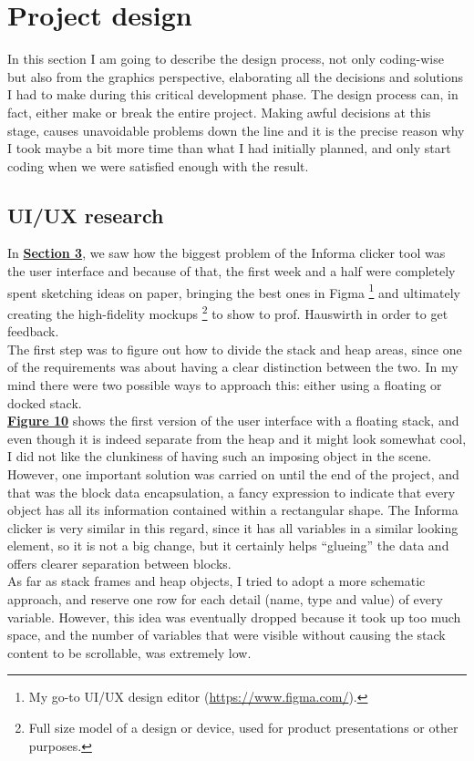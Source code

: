 \documentclass[]{usiinfbachelorproject}
\begin{document}
\vspace{\fill}
\pagebreak

\section{Project design} \label{design}

In this section I am going to describe the design process, not only coding-wise but also from the graphics perspective, elaborating all the decisions and solutions I had to make during this critical development phase. The design process can, in fact, either make or break the entire project. Making awful decisions at this stage, causes unavoidable problems down the line and it is the precise reason why I took maybe a bit more time than what I had initially planned, and only start coding when we were satisfied enough with the result.

\subsection{UI/UX research} \label{ui-ux research}

In \hyperref[requirements+analysis]{\textbf{Section 3}}, we saw how the biggest problem of the Informa clicker tool was the user interface and because of that, the first week and a half were completely spent sketching ideas on paper, bringing the best ones in Figma \footnote{My go-to UI/UX design editor (\url{https://www.figma.com/}).} and ultimately creating the high-fidelity mockups \footnote{Full size model of a design or device, used for product presentations or other purposes.} to show to prof. Hauswirth in order to get feedback.\\
The first step was to figure out how to divide the stack and heap areas, since one of the requirements was about having a clear distinction between the two. In my mind there were two possible ways to approach this: either using a floating or docked stack.\\

\noindent \hyperref[floating stack]{\textbf{Figure 10}} shows the first version of the user interface with a floating stack, and even though it is indeed separate from the heap and it might look somewhat cool, I did not like the clunkiness of having such an imposing object in the scene. However, one important solution was carried on until the end of the project, and that was the block data encapsulation, a fancy expression to indicate that every object has all its information contained within a rectangular shape. The Informa clicker is very similar in this regard, since it has all variables in a similar looking element, so it is not a big change, but it certainly helps ``glueing'' the data and offers clearer separation between blocks.\\
As far as stack frames and heap objects, I tried to adopt a more schematic approach, and reserve one row for each detail (name, type and value) of every variable. However, this idea was eventually dropped because it took up too much space, and the number of variables that were visible without causing the stack content to be scrollable, was extremely low. 
\end{document}
